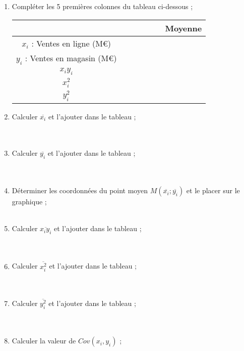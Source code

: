 \documentclass[11pt]{article}
\begin{document}
\begin{enumerate}
\item Compléter les 5 premières colonnes du tableau ci-dessous ; 
\renewcommand{\arraystretch}{1.5}
\begin{center}
\begin{tabular}{|c|c|c|c|c|c|c|}
\hline
\phantom{0000} & \phantom{0000} & \phantom{0000} &\phantom{0000}  & \phantom{0000} & \phantom{0000} & Moyenne  \\
\hline
$x_i$ : Ventes en ligne (M€) &  &  &  &  &  &  \\
\hline
$y_i$ : Ventes en magasin (M€)  &  &  &  &  &  &  \\
\hline
$x_iy_i$  &  &  &  &  &  &  \\
\hline
$x_i^2$  &  &  &  &  &  &  \\
\hline
$y_i^2$  &  &  &  &  &  &  \\
\hline
\end{tabular}
\end{center}
\item Calculer $\overline{x_i}$ et l'ajouter dans le tableau ; 
\\ \dtf \\ \dtf \\ \dtf
\item Calculer $\overline{y_i}$ et l'ajouter dans le tableau ; 
\\ \dtf \\ \dtf \\ \dtf
\item Déterminer les coordonnées du point moyen
$M(\overline{x_i};\overline{y_i})$ et le placer sur le graphique ; 
\\ \dtf \\ \dtf
\item Calculer $\overline{x_iy_i}$ et l'ajouter dans le tableau ; 
\\ \dtf \\ \dtf \\ \dtf
\item Calculer $\overline{x_i^2}$ et l'ajouter dans le tableau ; 
\\ \dtf \\ \dtf \\ \dtf
\item Calculer $\overline{y_i^2}$ et l'ajouter dans le tableau ; 
\\ \dtf \\ \dtf \\ \dtf
\item Calculer la valeur de  $Cov(x_i,y_i)$  ; 

\end{enumerate}
\end{document}
